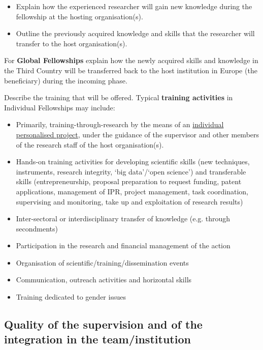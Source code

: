 \begin{itemize}
  \item
    Explain how the experienced researcher will gain new knowledge
    during the fellowship at the hosting organisation(s).
  \item
    Outline the previously acquired knowledge and skills that the
    researcher will transfer to the host organisation(s).

\end{itemize}

For \textbf{Global Fellowships} explain how the newly acquired
skills and knowledge in the Third Country will be transferred back
to the host institution in Europe (the beneficiary) during the
incoming phase.

Describe the training that will be offered. Typical
\textbf{training activities} in Individual Fellowships may
include:

\begin{itemize}
  \item 
    Primarily, training-through-research by the means of an
    \ul{individual personalised project}, under the guidance of the
    supervisor and other members of the research staff of the host
    organisation(s).
  \item
    Hands-on training activities for developing scientific skills (new
    techniques, instruments, research integrity, `big data'/`open
    science') and transferable skills (entrepreneurship, proposal
    preparation to request funding, patent applications, management of
    IPR, project management, task coordination, supervising and
    monitoring, take up and exploitation of research results)
  \item
    Inter-sectoral or interdisciplinary transfer of knowledge (e.g.
    through secondments)
  \item
    Participation in the research and financial management of the action
  \item
    Organisation of scientific/training/dissemination events
  \item
    Communication, outreach activities and horizontal skills
  \item
    Training dedicated to gender issues
\end{itemize}

\subsection{Quality of the supervision and of the integration in
the team/institution}
\label{sec:excellence_supervision}

